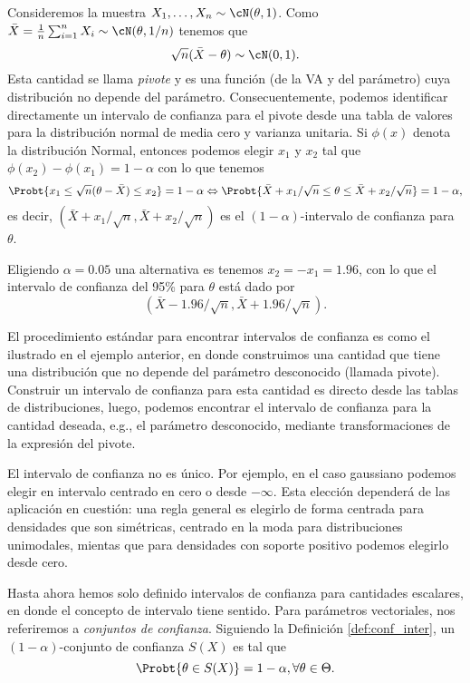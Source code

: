 \begin{example}
	Consideremos la muestra $X_1,\ldots,X_n\sim\cN(\theta,1)$. Como $\bar{X}=\frac{1}{n}\sum_{i=1}^nX_i\sim\cN(\theta,1/n)$ tenemos que  
	\begin{equation}
			\sqrt{n}(\bar{X}-\theta)\sim\cN(0,1).
		\end{equation}	
	Esta cantidad se llama \emph{pivote} y es una función (de la VA y del parámetro) cuya distribución no depende del parámetro. Consecuentemente, podemos identificar directamente un intervalo de confianza para el pivote desde una tabla de valores para la distribución normal de media cero y varianza unitaria. Si $\phi(x)$ denota la distribución Normal, entonces podemos elegir  $x_1$ y $x_2$ tal que $\phi(x_2)-\phi(x_1) = 1-\alpha$ con lo que tenemos
	\begin{equation}
	 	\Probt{x_1 \leq \sqrt{n}(\theta-\bar{X}) \leq x_2} = 1-\alpha \Leftrightarrow \Probt{\bar{X} + x_1/\sqrt{n} \leq \theta \leq \bar{X} + x_2/\sqrt{n}} = 1-\alpha,
	 \end{equation} 
	 es decir, $(\bar{X} + x_1/\sqrt{n},\bar{X} + x_2/\sqrt{n})$ es el $(1-\alpha)$-intervalo de confianza para $\theta$. 
	 
	 Eligiendo $\alpha=0.05$ una alternativa es tenemos $x_2 = -x_1 =1.96$, con lo que el intervalo de confianza del 95\% para $\theta$ está dado por 
	 \begin{equation}
	 	(\bar{X} -1.96/\sqrt{n},\bar{X} + 1.96/\sqrt{n}).
	 \end{equation}

	 El procedimiento estándar para encontrar intervalos de confianza es como el ilustrado en el ejemplo anterior, en donde construimos una cantidad que tiene una distribución que no depende del parámetro desconocido (llamada pivote). Construir un intervalo de confianza para esta cantidad es directo desde las tablas de distribuciones, luego, podemos encontrar el intervalo de confianza para la cantidad deseada, e.g., el parámetro desconocido, mediante transformaciones de la expresión del pivote. 

	 \begin{remark}
	 	El intervalo de confianza no es único. Por ejemplo, en el caso gaussiano podemos elegir en intervalo centrado en cero o desde $-\infty$. Esta elección dependerá de las aplicación en cuestión: una regla general es elegirlo de forma centrada para densidades que son simétricas, centrado en la moda para distribuciones unimodales, mientas que para densidades con soporte positivo podemos elegirlo desde cero. 
	 \end{remark}

	 Hasta ahora hemos solo definido intervalos de confianza para cantidades escalares, en donde el concepto de intervalo tiene sentido. Para parámetros vectoriales, nos referiremos a  \textit{conjuntos de confianza}. Siguiendo la Definición \ref{def:conf_inter}, un $(1-\alpha)$-conjunto de confianza $S(X)$ es tal que 
	 \begin{equation}
	\label{eq:conf_set}
	\Probt{\theta\in S(X)} = 1-\alpha, \forall \theta\in\Theta.
\end{equation}
\end{example}


